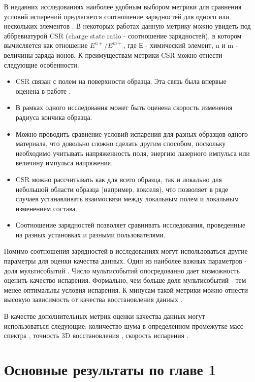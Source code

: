 В недавних исследованиях наиболее удобным выбором метрики для сравнения условий испарений предлагается соотношение зарядностей для одного или нескольких элементов \cite{Tu15,Vurpillot16,Diercks13,Mancini14}. В некоторых работах данную метрику можно увидеть под аббревиатурой CSR (charge state ratio - соотношение зарядностей), в котором вычисляется как отношение $E^{n+}/E^{m+}$, где Е - химический элемент, n и m - величины заряда ионов. К преимуществам метрики CSR можно отнести следующие особенности:
\begin{itemize}
	\item CSR связан с полем на поверхности образца. Эта связь была впервые оценена в работе \cite{Kingham82}.
	\item В рамках одного исследования может быть оценена скорость изменения радиуса кончика образца.
	\item Можно проводить сравнение условий испарения для разных образцов одного материала, что довольно сложно сделать другим способом, поскольку необходимо учитывать напряженность поля, энергию лазерного импульса или величину импульса напряжения.
	\item CSR можно рассчитывать как для всего образца, так и локально для небольшой области образца (например, вокселя), что позволяет в ряде случаев устанавливать взаимосвязи между локальным полем и локальным изменением состава.
	\item Соотношение зарядностей позволяет сравнивать исследования, проведенные на разных установках и разными пользователями.
\end{itemize} 

Помимо соотношения зарядностей в исследованиях могут использоваться другие параметры для оценки качества данных. Один из наиболее важных параметров - доля мультисобытий \cite{Valderrama15}. Число мультисобытий опосредованно дает возможность оценить качество испарения. Формально, чем больше доля мультисобытий - тем менее оптимальны условия испарения. К минусам такой метрики можно отнести высокую зависимость от качества восстановления данных \cite{DaCosta12}.

В качестве дополнительных метрик оценки качества данных могут использоваться следующие: количество шума в определенном промежутке масс-спектра \cite{Valderrama15}, точность 3D восстановления \cite{Tegg23}, скорость испарения \cite{Raznitsyn18}.


\FloatBarrier

\section{Основные результаты по главе 1}\label{sec:ch1/sec6}

